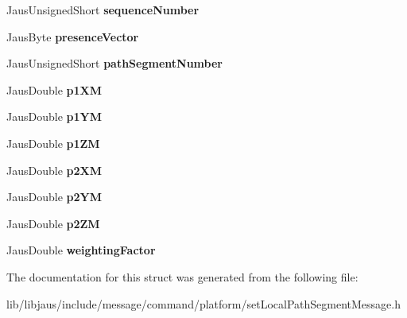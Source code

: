 \begin{DoxyCompactItemize}
\item 
\hypertarget{struct_set_local_path_segment_message_struct_ac0b6cf4103e1e3e8b838938266719729}{\-Jaus\-Unsigned\-Short {\bfseries sequence\-Number}}\label{struct_set_local_path_segment_message_struct_ac0b6cf4103e1e3e8b838938266719729}

\item 
\hypertarget{struct_set_local_path_segment_message_struct_a3886018b9527b0b01b961a27b987d613}{\-Jaus\-Byte {\bfseries presence\-Vector}}\label{struct_set_local_path_segment_message_struct_a3886018b9527b0b01b961a27b987d613}

\item 
\hypertarget{struct_set_local_path_segment_message_struct_ad732f24dce5516d9007469f588a52bd2}{\-Jaus\-Unsigned\-Short {\bfseries path\-Segment\-Number}}\label{struct_set_local_path_segment_message_struct_ad732f24dce5516d9007469f588a52bd2}

\item 
\hypertarget{struct_set_local_path_segment_message_struct_a526ca8ddf9afbe33a880784ceb7f344f}{\-Jaus\-Double {\bfseries p1\-X\-M}}\label{struct_set_local_path_segment_message_struct_a526ca8ddf9afbe33a880784ceb7f344f}

\item 
\hypertarget{struct_set_local_path_segment_message_struct_a2b1502a2cc2db45e1acb59e0a8050a26}{\-Jaus\-Double {\bfseries p1\-Y\-M}}\label{struct_set_local_path_segment_message_struct_a2b1502a2cc2db45e1acb59e0a8050a26}

\item 
\hypertarget{struct_set_local_path_segment_message_struct_af43b35f535c6a6fa2683b1104cf6159f}{\-Jaus\-Double {\bfseries p1\-Z\-M}}\label{struct_set_local_path_segment_message_struct_af43b35f535c6a6fa2683b1104cf6159f}

\item 
\hypertarget{struct_set_local_path_segment_message_struct_a86b9450452854b55937106b60640649d}{\-Jaus\-Double {\bfseries p2\-X\-M}}\label{struct_set_local_path_segment_message_struct_a86b9450452854b55937106b60640649d}

\item 
\hypertarget{struct_set_local_path_segment_message_struct_a7ec36c07e323e64acbecb765613b01c8}{\-Jaus\-Double {\bfseries p2\-Y\-M}}\label{struct_set_local_path_segment_message_struct_a7ec36c07e323e64acbecb765613b01c8}

\item 
\hypertarget{struct_set_local_path_segment_message_struct_abf0575bb990987bc8dc3326ec0ba0774}{\-Jaus\-Double {\bfseries p2\-Z\-M}}\label{struct_set_local_path_segment_message_struct_abf0575bb990987bc8dc3326ec0ba0774}

\item 
\hypertarget{struct_set_local_path_segment_message_struct_a428474a344a016a2ff0cfc751fa2cfb2}{\-Jaus\-Double {\bfseries weighting\-Factor}}\label{struct_set_local_path_segment_message_struct_a428474a344a016a2ff0cfc751fa2cfb2}

\end{DoxyCompactItemize}


\-The documentation for this struct was generated from the following file\-:\begin{DoxyCompactItemize}
\item 
lib/libjaus/include/message/command/platform/set\-Local\-Path\-Segment\-Message.\-h\end{DoxyCompactItemize}
